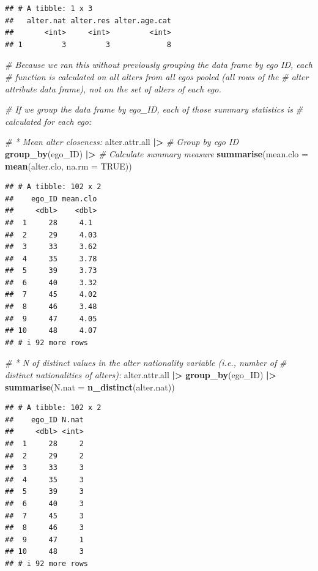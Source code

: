 \documentclass[
]{book}
\newenvironment{Shaded}{\begin{snugshade}}{\end{snugshade}}
\newcommand{\AttributeTok}[1]{\textcolor[rgb]{0.13,0.29,0.53}{#1}}
\newcommand{\CommentTok}[1]{\textcolor[rgb]{0.56,0.35,0.01}{\textit{#1}}}
\newcommand{\ConstantTok}[1]{\textcolor[rgb]{0.56,0.35,0.01}{#1}}
\newcommand{\FunctionTok}[1]{\textcolor[rgb]{0.13,0.29,0.53}{\textbf{#1}}}
\newcommand{\NormalTok}[1]{#1}
\newcommand{\SpecialCharTok}[1]{\textcolor[rgb]{0.81,0.36,0.00}{\textbf{#1}}}
\begin{document}
\begin{verbatim}
## # A tibble: 1 x 3
##   alter.nat alter.res alter.age.cat
##       <int>     <int>         <int>
## 1         3         3             8
\end{verbatim}

\begin{Shaded}
\begin{Highlighting}[]
\CommentTok{\# Because we ran this without previously grouping the data frame by ego ID, each}
\CommentTok{\# function is calculated on all alters from all egos pooled (all rows of the}
\CommentTok{\# alter attribute data frame), not on the set of alters of each ego.}

\CommentTok{\# If we group the data frame by ego\_ID, each of those summary statistics is}
\CommentTok{\# calculated for each ego:}

\CommentTok{\# * Mean alter closeness:}
\NormalTok{alter.attr.all }\SpecialCharTok{|\textgreater{}}
  \CommentTok{\# Group by ego ID}
  \FunctionTok{group\_by}\NormalTok{(ego\_ID) }\SpecialCharTok{|\textgreater{}}
  \CommentTok{\# Calculate summary measure}
  \FunctionTok{summarise}\NormalTok{(}\AttributeTok{mean.clo =} \FunctionTok{mean}\NormalTok{(alter.clo, }\AttributeTok{na.rm =} \ConstantTok{TRUE}\NormalTok{))}
\end{Highlighting}
\end{Shaded}

\begin{verbatim}
## # A tibble: 102 x 2
##    ego_ID mean.clo
##     <dbl>    <dbl>
##  1     28     4.1 
##  2     29     4.03
##  3     33     3.62
##  4     35     3.78
##  5     39     3.73
##  6     40     3.32
##  7     45     4.02
##  8     46     3.48
##  9     47     4.05
## 10     48     4.07
## # i 92 more rows
\end{verbatim}

\begin{Shaded}
\begin{Highlighting}[]
\CommentTok{\# * N of distinct values in the alter nationality variable (i.e., number of }
\CommentTok{\# distinct nationalities of alters):}
\NormalTok{alter.attr.all }\SpecialCharTok{|\textgreater{}}
  \FunctionTok{group\_by}\NormalTok{(ego\_ID) }\SpecialCharTok{|\textgreater{}}
  \FunctionTok{summarise}\NormalTok{(}\AttributeTok{N.nat =} \FunctionTok{n\_distinct}\NormalTok{(alter.nat))}
\end{Highlighting}
\end{Shaded}

\begin{verbatim}
## # A tibble: 102 x 2
##    ego_ID N.nat
##     <dbl> <int>
##  1     28     2
##  2     29     2
##  3     33     3
##  4     35     3
##  5     39     3
##  6     40     3
##  7     45     3
##  8     46     3
##  9     47     1
## 10     48     3
## # i 92 more rows
\end{verbatim}
\end{document}
